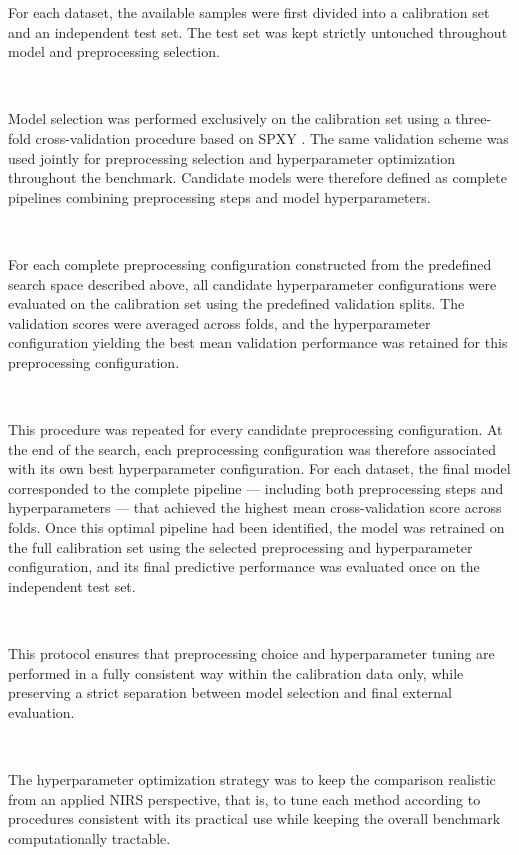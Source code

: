 \documentclass{article}
\begin{document}
For each dataset, the available samples were first divided into a calibration set and an independent test set. The test set was kept strictly untouched throughout model and preprocessing selection.

~

Model selection was performed exclusively on the calibration set using a three-fold cross-validation procedure based on SPXY \cite{Galvao2005KS}. The same validation scheme was used jointly for preprocessing selection and hyperparameter optimization throughout the benchmark. Candidate models were therefore defined as complete pipelines combining preprocessing steps and model hyperparameters.

~

For each complete preprocessing configuration constructed from the predefined search space described above, all candidate hyperparameter configurations were evaluated on the calibration set using the predefined validation splits. The validation scores were averaged across folds, and the hyperparameter configuration yielding the best mean validation performance was retained for this preprocessing configuration.

~

This procedure was repeated for every candidate preprocessing configuration. At the end of the search, each preprocessing configuration was therefore associated with its own best hyperparameter configuration. For each dataset, the final model corresponded to the complete pipeline — including both preprocessing steps and hyperparameters — that achieved the highest mean cross-validation score across folds. Once this optimal pipeline had been identified, the model was retrained on the full calibration set using the selected preprocessing and hyperparameter configuration, and its final predictive performance was evaluated once on the independent test set.

~

This protocol ensures that preprocessing choice and hyperparameter tuning are performed in a fully consistent way within the calibration data only, while preserving a strict separation between model selection and final external evaluation.

~

The hyperparameter optimization strategy was to keep the comparison realistic from an applied NIRS perspective, that is, to tune each method according to procedures consistent with its practical use while keeping the overall benchmark computationally tractable.
\end{document}
